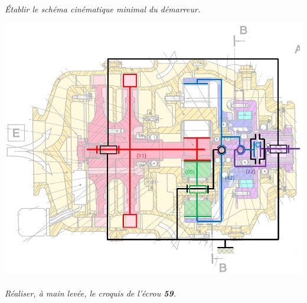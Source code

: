 \documentclass[11pt,oneside]{article}
\begin{document}
\paragraph{}
\textit{Établir le schéma cinématique minimal du démarreur. }

\begin{center}
\includegraphics[width=.75\textwidth]{png/schema}
\end{center}

\paragraph{}
\textit{Réaliser, à main levée, le croquis de l'écrou \textbf{59}.}
\end{document}
